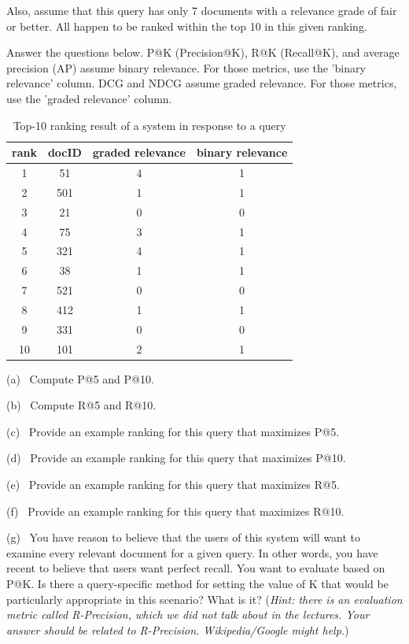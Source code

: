 \documentclass[a4paper, utf8]{ctexart}
\begin{document}
	Also, assume that this query has only 7 documents with a relevance grade of fair or better. All happen to be ranked within the top 10 in this given ranking. 
	
	Answer the questions below. P@K (Precision@K), R@K (Recall@K), and average precision (AP) assume binary relevance. For those metrics, use the 'binary relevance' column. DCG and NDCG assume graded relevance. For those metrics, use the 'graded relevance' column. 
	
	\begin{table}[http]
		\begin{center}
			\caption{Top-10 ranking result of a system in response to a query}
			\begin{tabular}{c c c c}
				\hline
				rank & docID & graded relevance & binary relevance \\
				\hline
				1 & 51 & 4 & 1 \\
				2 & 501 & 1 & 1 \\
				3 & 21 & 0 & 0 \\
				4 & 75 & 3 & 1 \\
				5 & 321 & 4 & 1\\
				6 & 38 & 1 & 1 \\
				7 & 521 & 0 & 0 \\
				8 & 412 & 1 & 1 \\
				9 & 331 & 0 & 0 \\
				10 & 101 & 2 & 1 \\
				\hline
			\end{tabular}
		\end{center}
	\end{table}
	
	(a)  Compute P@5 and P@10.  
	
	(b)  Compute R@5 and R@10.  
	
	(c)  Provide an example ranking for this query that maximizes P@5.
	
	(d)  Provide an example ranking for this query that maximizes P@10.
	
	(e)  Provide an example ranking for this query that maximizes R@5.
	
	(f)  Provide an example ranking for this query that maximizes R@10.
	
	(g)  You have reason to believe that the users of this system will want to examine every relevant document for a given query. In other words, you have recent to believe that users want perfect recall. You want to evaluate based on P@K. Is there a query-specific method for setting the value of K that would be particularly appropriate in this scenario? What is it? (\textit{Hint: there is an evaluation metric called R-Precision, which we did not talk about in the lectures. Your answer should be related to R-Precision. Wikipedia/Google might help.})
	
\end{document}
